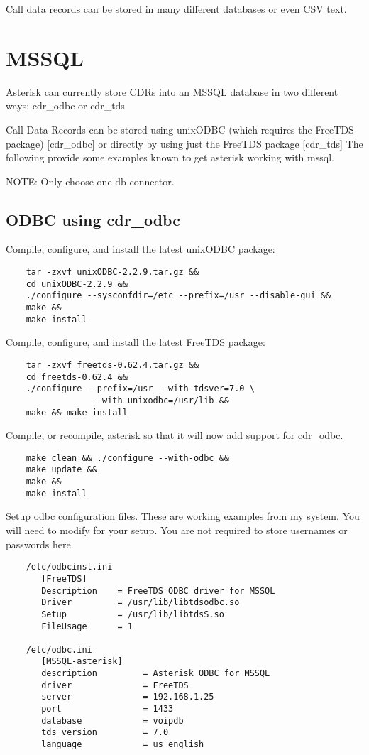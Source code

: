 Call data records can be stored in many different databases or even CSV text.

\section{MSSQL}

	Asterisk can currently store CDRs into an MSSQL database in
	two different ways:  cdr\_odbc or cdr\_tds
	
	Call Data Records can be stored using unixODBC (which requires
	the FreeTDS package) [cdr\_odbc] or directly by using just the
	FreeTDS package [cdr\_tds]  The following provide some
	examples known to get asterisk working with mssql.

	NOTE:  Only choose one db connector.

\subsection{ODBC using cdr\_odbc}
	Compile, configure, and install the latest unixODBC package:
\begin{verbatim}
	tar -zxvf unixODBC-2.2.9.tar.gz &&
	cd unixODBC-2.2.9 &&
	./configure --sysconfdir=/etc --prefix=/usr --disable-gui &&
	make &&
	make install
\end{verbatim}

	Compile, configure, and install the latest FreeTDS package:
\begin{verbatim}
	tar -zxvf freetds-0.62.4.tar.gz &&
	cd freetds-0.62.4 &&
	./configure --prefix=/usr --with-tdsver=7.0 \
                 --with-unixodbc=/usr/lib &&
	make && make install
\end{verbatim}

	Compile, or recompile, asterisk so that it will now add support
	for cdr\_odbc.
\begin{verbatim}
	make clean && ./configure --with-odbc &&
	make update &&
	make &&
	make install
\end{verbatim}

	Setup odbc configuration files.  These are working examples
	from my system.  You will need to modify for your setup.
	You are not required to store usernames or passwords here.

\begin{verbatim}
	/etc/odbcinst.ini
	   [FreeTDS]
	   Description    = FreeTDS ODBC driver for MSSQL
	   Driver         = /usr/lib/libtdsodbc.so
	   Setup          = /usr/lib/libtdsS.so
	   FileUsage      = 1

	/etc/odbc.ini
	   [MSSQL-asterisk]
	   description         = Asterisk ODBC for MSSQL
	   driver              = FreeTDS
	   server              = 192.168.1.25
	   port                = 1433
	   database            = voipdb
	   tds_version         = 7.0
	   language            = us_english
\end{verbatim}

